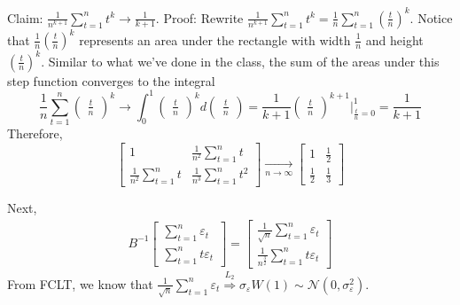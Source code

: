 \documentclass[]{article}
\begin{document}
\begin{enumerate}[label=(\alph*)]
	Claim: $\frac{1}{n^{k+1}}\sum\limits_{t = 1}^nt^k \longrightarrow \frac{1}{k+1}$. Proof: Rewrite $\frac{1}{n^{k+1}}\sum\limits_{t = 1}^nt^k = \frac{1}{n}\sum\limits_{t = 1}^n(\frac{t}{n})^k$. Notice that $\frac{1}{n}(\frac{t}{n})^k$ represents an area under the rectangle with width $\frac{1}{n}$ and height $(\frac{t}{n})^k$. Similar to what we've done in the class, the sum of the areas under this step function converges to the integral
	\begin{equation}
		\frac{1}{n}\sum\limits_{t = 1}^n\begin{pmatrix}\frac{t}{n}\end{pmatrix}^k \longrightarrow \int_{0}^{1}\begin{pmatrix}\frac{t}{n}\end{pmatrix}^k d\begin{pmatrix}\frac{t}{n}\end{pmatrix} = \frac{1}{k + 1}\begin{pmatrix}\frac{t}{n}\end{pmatrix}^{k+1}\bigg\rvert_{\frac{t}{n} = 0}^1 = \frac{1}{k + 1} \nonumber
	\end{equation}
	Therefore, 
	\begin{equation}
		\begin{bmatrix}1 & \frac{1}{n^2}\sum\limits_{t = 1}^nt \\ \frac{1}{n^2}\sum\limits_{t = 1}^nt & \frac{1}{n^3}\sum\limits_{t = 1}^nt^2\end{bmatrix}\underset{n\to\infty}{\longrightarrow} \begin{bmatrix}1 & \frac{1}{2} \\ \frac{1}{2} & \frac{1}{3}\end{bmatrix} \nonumber
	\end{equation}
	
	
	Next,
	\begin{equation}
	\begin{split}
	B^{-1}\begin{bmatrix}\sum\limits_{t = 1}^n\varepsilon_t \\ \sum\limits_{t = 1}^nt\varepsilon_t\end{bmatrix} = \begin{bmatrix}\frac{1}{\sqrt{n}}\sum\limits_{t = 1}^n\varepsilon_t \\ \frac{1}{n^{\frac{3}{2}}}\sum\limits_{t = 1}^nt\varepsilon_t\end{bmatrix} \nonumber
	\end{split}
	\end{equation}
	From FCLT, we know that $\frac{1}{\sqrt{n}}\sum\limits_{t = 1}^n\varepsilon_t \overset{L_2}{\Longrightarrow} \sigma_\varepsilon W(1) \sim \mathcal{N}(0, \sigma_\varepsilon^2)$. 
	

\end{enumerate}
\end{document}

